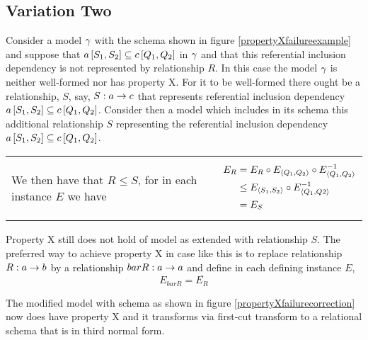 \subsection{Variation  Two}
Consider a model $\gamma$ with the schema shown in figure \ref{propertyXfailureexample} and suppose that $a\left[S_1,S_2\right]\subseteq c\left[Q_1,Q_2\right]$ in $\gamma$ and that this referential inclusion dependency is not represented by relationship $R$.
In this case the model $\gamma$ is neither well-formed nor has property X. 
For it to  be well-formed there ought be a relationship, $S$, say,
$S:a \rightarrow c$ that represents referential inclusion dependency $a\left[S_1,S_2\right]\subseteq c\left[Q_1,Q_2\right]$. Consider then a model
which includes in its schema  this additional relationship $S$ representing the referential inclusion dependency $a\left[S_1,S_2\right]\subseteq c\left[Q_1,Q_2\right]$.\\

\begin{tabular}{ p{8.5cm}  c}
We then have that $R \leq S$, for in each instance $E$ we have&\parbox{5cm}{ \begin{align*}
E_R&=E_R \circ E_{\langle Q_1,Q_2\rangle} \circ E^{-1}_{\langle Q_1,Q_2\rangle} \\
   & \leq E_{\langle S_1,S_2\rangle} \circ E^{-1}_{\langle Q_1,Q2\rangle} \\
	 & = E_{S}
\end{align*}}
\end{tabular}

Property X still does not hold of  model as extended with relationship $S$. The  preferred way to achieve property X in  case like this is to replace relationship $R: a \rightarrow b$ by a relationship $barR: a \rightarrow a$ and define in each defining instance $E$,
\begin{equation}
E_{barR} = \overline{E_R}
\end{equation}

The modified model with schema as shown in figure \ref{propertyXfailurecorrection}  now does have property X and it transforms via first-cut transform to a relational schema that is in third normal form.

